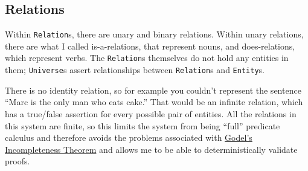 \documentclass[a4paper, 11pt]{article}
\begin{document}
\subsection{Relations}
Within \texttt{Relation}s, there are unary and binary relations. Within unary relations, there are what I called is-a-relations, that represent nouns, and does-relations, which represent verbs. The \texttt{Relation}s themselves do not hold any entities in them; \texttt{Universe}s assert relationships between \texttt{Relation}s and \texttt{Entity}s.

There is no identity relation, so for example you couldn't represent the sentence ``Marc is the only man who eats cake.'' That would be an infinite relation, which has a true/false assertion for every possible pair of entities. All the relations in this system are finite, so this limits the system from being ``full'' predicate calculus and therefore avoids the problems associated with \href{https://en.wikipedia.org/wiki/G\%C3\%B6del's\_incompleteness\_theorems\#First\_incompleteness\_theorem}{Godel's Incompleteness Theorem} and allows me to be able to deterministically validate proofs.
\end{document}
